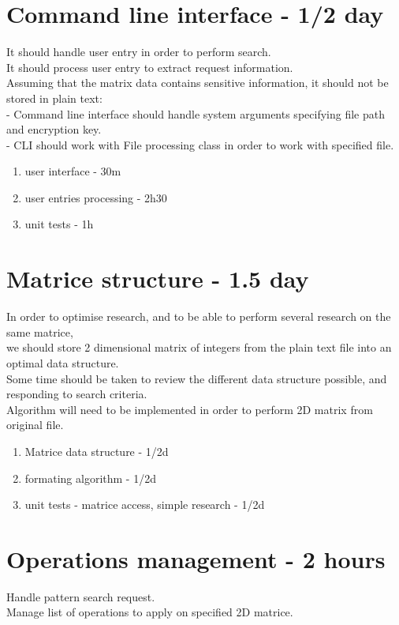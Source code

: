 \section{Command line interface - 1/2 day}
It should handle user entry in order to perform search.\\
It should process user entry to extract request information.\\
Assuming that the matrix data contains sensitive information, it should not be stored in plain text:\\
- Command line interface should handle system arguments specifying file path and encryption key.\\
- CLI should work with File processing class in order to work with specified file.\\
\begin{enumerate}
    \item user interface - 30m
    \item user entries processing - 2h30
    \item unit tests - 1h
\end{enumerate}

\section{Matrice structure - 1.5 day}
In order to optimise research, and to be able to perform several research on the same matrice,\\
we should store 2 dimensional matrix of integers from the plain text file into an optimal data structure.\\
Some time should be taken to review the different data structure possible, and responding to search criteria.\\
Algorithm will need to be implemented in order to perform 2D matrix from original file.\\
\begin{enumerate}
    \item Matrice data structure - 1/2d
    \item formating algorithm - 1/2d
    \item unit tests - matrice access, simple research - 1/2d
\end{enumerate}

\section{Operations management - 2 hours}
Handle pattern search request.\\
Manage list of operations to apply on specified 2D matrice.

